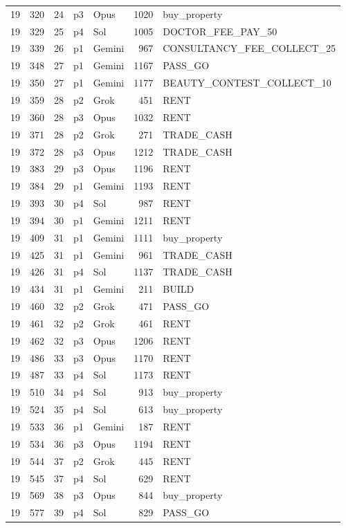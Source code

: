 \begin{longtable}{r r r l l r >{\ttfamily}l}
19 & 320 & 24 & p3 & Opus & 1020 & buy\_property \\
19 & 329 & 25 & p4 & Sol & 1005 & DOCTOR\_FEE\_PAY\_50 \\
19 & 339 & 26 & p1 & Gemini & 967 & CONSULTANCY\_FEE\_COLLECT\_25 \\
19 & 348 & 27 & p1 & Gemini & 1167 & PASS\_GO \\
19 & 350 & 27 & p1 & Gemini & 1177 & BEAUTY\_CONTEST\_COLLECT\_10 \\
19 & 359 & 28 & p2 & Grok & 451 & RENT \\
19 & 360 & 28 & p3 & Opus & 1032 & RENT \\
19 & 371 & 28 & p2 & Grok & 271 & TRADE\_CASH \\
19 & 372 & 28 & p3 & Opus & 1212 & TRADE\_CASH \\
19 & 383 & 29 & p3 & Opus & 1196 & RENT \\
19 & 384 & 29 & p1 & Gemini & 1193 & RENT \\
19 & 393 & 30 & p4 & Sol & 987 & RENT \\
19 & 394 & 30 & p1 & Gemini & 1211 & RENT \\
19 & 409 & 31 & p1 & Gemini & 1111 & buy\_property \\
19 & 425 & 31 & p1 & Gemini & 961 & TRADE\_CASH \\
19 & 426 & 31 & p4 & Sol & 1137 & TRADE\_CASH \\
19 & 434 & 31 & p1 & Gemini & 211 & BUILD \\
19 & 460 & 32 & p2 & Grok & 471 & PASS\_GO \\
19 & 461 & 32 & p2 & Grok & 461 & RENT \\
19 & 462 & 32 & p3 & Opus & 1206 & RENT \\
19 & 486 & 33 & p3 & Opus & 1170 & RENT \\
19 & 487 & 33 & p4 & Sol & 1173 & RENT \\
19 & 510 & 34 & p4 & Sol & 913 & buy\_property \\
19 & 524 & 35 & p4 & Sol & 613 & buy\_property \\
19 & 533 & 36 & p1 & Gemini & 187 & RENT \\
19 & 534 & 36 & p3 & Opus & 1194 & RENT \\
19 & 544 & 37 & p2 & Grok & 445 & RENT \\
19 & 545 & 37 & p4 & Sol & 629 & RENT \\
19 & 569 & 38 & p3 & Opus & 844 & buy\_property \\
19 & 577 & 39 & p4 & Sol & 829 & PASS\_GO \\

\end{longtable}
